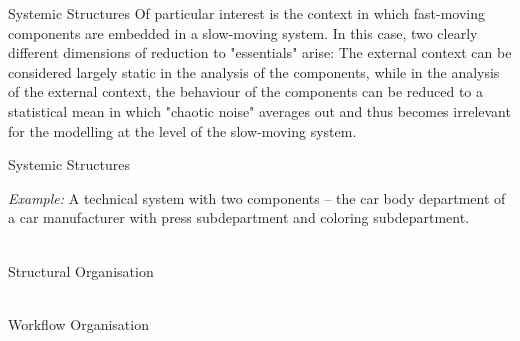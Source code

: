 \documentclass{beamer}
\begin{document}
\begin{frame}{Systemic Structures}
Of particular interest is the context in which fast-moving components are
embedded in a slow-moving system. In this case, two clearly different
dimensions of reduction to "essentials" arise: The external context can be
considered largely static in the analysis of the components, while in the
analysis of the external context, the behaviour of the components can be
reduced to a statistical mean in which "chaotic noise" averages out and thus
becomes irrelevant for the modelling at the level of the slow-moving system.

\end{frame}

\begin{frame}{Systemic Structures}

  \emph{Example:} A technical system with two components -- the car body
  department of a car manufacturer with press subdepartment and coloring
  subdepartment.
    
  \begin{minipage}{.42\textwidth}\centering\vspace*{2em}
    \\[2em] Structural Organisation
  \end{minipage}\hfill
  \begin{minipage}{.55\textwidth}\centering
    \\[2em] Workflow Organisation
  \end{minipage}
\end{frame}
\end{document}

